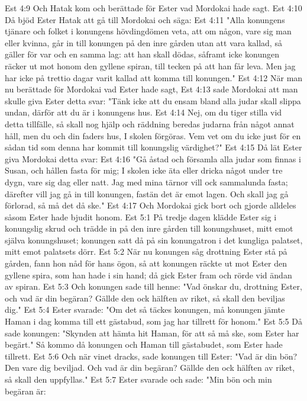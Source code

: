 Est 4:9  Och Hatak kom och berättade för Ester vad Mordokai hade sagt.
Est 4:10  Då bjöd Ester Hatak att gå till Mordokai och säga:
Est 4:11  "Alla konungens tjänare och folket i konungens hövdingdömen veta, att om någon, vare sig man eller kvinna, går in till konungen på den inre gården utan att vara kallad, så gäller för var och en samma lag: att han skall dödas, såframt icke konungen räcker ut mot honom den gyllene spiran, till tecken på att han får leva. Men jag har icke på trettio dagar varit kallad att komma till konungen."
Est 4:12  När man nu berättade för Mordokai vad Ester hade sagt,
Est 4:13  sade Mordokai att man skulle giva Ester detta svar: "Tänk icke att du ensam bland alla judar skall slippa undan, därför att du är i konungens hus.
Est 4:14  Nej, om du tiger stilla vid detta tillfälle, så skall nog hjälp och räddning beredas judarna från något annat håll, men du och din faders hus, I skolen förgöras. Vem vet om du icke just för en sådan tid som denna har kommit till konungslig värdighet?"
Est 4:15  Då lät Ester giva Mordokai detta svar:
Est 4:16  "Gå åstad och församla alla judar som finnas i Susan, och hållen fasta för mig; I skolen icke äta eller dricka något under tre dygn, vare sig dag eller natt. Jag med mina tärnor vill ock sammalunda fasta; därefter vill jag gå in till konungen, fastän det är emot lagen. Och skall jag gå förlorad, så må det då ske."
Est 4:17  Och Mordokai gick bort och gjorde alldeles såsom Ester hade bjudit honom.
Est 5:1  På tredje dagen klädde Ester sig i konungslig skrud och trädde in på den inre gården till konungshuset, mitt emot själva konungshuset; konungen satt då på sin konungatron i det kungliga palatset, mitt emot palatsets dörr.
Est 5:2  När nu konungen såg drottning Ester stå på gården, fann hon nåd för hans ögon, så att konungen räckte ut mot Ester den gyllene spira, som han hade i sin hand; då gick Ester fram och rörde vid ändan av spiran.
Est 5:3  Och konungen sade till henne: "Vad önskar du, drottning Ester, och vad är din begäran? Gällde den ock hälften av riket, så skall den beviljas dig."
Est 5:4  Ester svarade: "Om det så täckes konungen, må konungen jämte Haman i dag komma till ett gästabud, som jag har tillrett för honom."
Est 5:5  Då sade konungen: "Skynden att hämta hit Haman, för att så må ske, som Ester har begärt." Så kommo då konungen och Haman till gästabudet, som Ester hade tillrett.
Est 5:6  Och när vinet dracks, sade konungen till Ester: "Vad är din bön? Den vare dig beviljad. Och vad är din begäran? Gällde den ock hälften av riket, så skall den uppfyllas."
Est 5:7  Ester svarade och sade: "Min bön och min begäran är:
